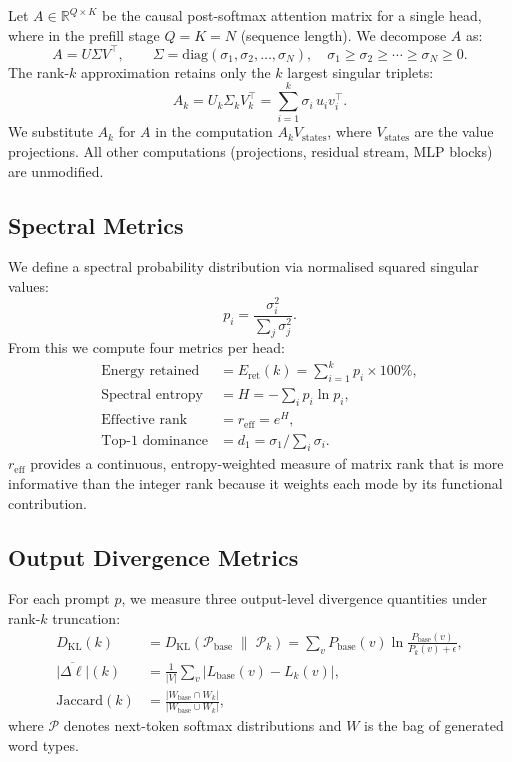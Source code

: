 \documentclass{article}
\begin{document}
Let $A \in \mathbb{R}^{Q \times K}$ be the causal post-softmax attention matrix
for a single head, where in the prefill stage $Q\!=\!K\!=\!N$ (sequence length).
We decompose $A$ as:
\begin{equation}
  A = U \Sigma V^\top, \qquad \Sigma = \mathrm{diag}(\sigma_1, \sigma_2, \ldots, \sigma_N),
  \quad \sigma_1 \geq \sigma_2 \geq \cdots \geq \sigma_N \geq 0.
\end{equation}
The rank-$k$ approximation retains only the $k$ largest singular triplets:
\begin{equation}
  A_k = U_k \Sigma_k V_k^\top = \sum_{i=1}^{k} \sigma_i \, u_i v_i^\top.
  \label{eq:truncation}
\end{equation}
We substitute $A_k$ for $A$ in the computation $A_k V_{\text{states}}$, where
$V_{\text{states}}$ are the value projections.  All other computations (projections,
residual stream, MLP blocks) are unmodified.

\subsection{Spectral Metrics}

We define a spectral probability distribution via normalised squared singular values:
\begin{equation}
  p_i = \frac{\sigma_i^2}{\sum_j \sigma_j^2}.
\end{equation}
From this we compute four metrics per head:
\begin{align}
  \text{Energy retained} &= E_{\text{ret}}(k) = \sum_{i=1}^{k} p_i \times 100\%, \\
  \text{Spectral entropy} &= H = -\sum_i p_i \ln p_i, \\
  \text{Effective rank}   &= r_{\text{eff}} = e^H, \\
  \text{Top-1 dominance}  &= d_1 = \sigma_1 / \sum_i \sigma_i.
\end{align}
$r_{\text{eff}}$ provides a continuous, entropy-weighted measure of matrix rank
\citep{roy2007effective} that is more informative than the integer rank because it
weights each mode by its functional contribution.

\subsection{Output Divergence Metrics}

For each prompt $p$, we measure three output-level divergence quantities under
rank-$k$ truncation:
\begin{align}
  D_\text{KL}(k) &= D_\text{KL}\!\left( \mathcal{P}_\text{base} \;\|\; \mathcal{P}_k \right)
    = \sum_v P_\text{base}(v) \ln \frac{P_\text{base}(v)}{P_k(v)+\epsilon}, \\
  \overline{|\Delta \ell|}(k) &= \frac{1}{|V|}\sum_v |L_\text{base}(v) - L_k(v)|, \\
  \text{Jaccard}(k) &= \frac{|W_\text{base} \cap W_k|}{|W_\text{base} \cup W_k|},
\end{align}
where $\mathcal{P}$ denotes next-token softmax distributions and $W$ is the bag of
generated word types.
\end{document}
